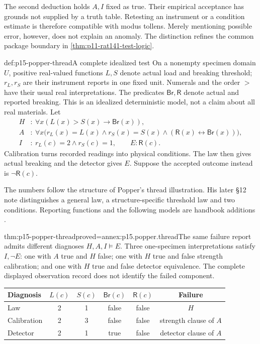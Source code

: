 The second deduction holds \(A,I\) fixed as true. Their empirical
acceptance has grounds not supplied by a truth table.
Retesting an instrument or a condition estimate is therefore
compatible with modus tollens. Merely mentioning possible error,
however, does not explain an anomaly.
The distinction refines the common package boundary in
\cref{thm:p11-rat141-test-logic}.

\begin{hbexample}{def:p15-popper-thread}{A complete idealized test}
On a nonempty specimen domain \(U\), positive real-valued functions
\(L,S\) denote actual load and breaking threshold; \(r_L,r_S\)
are their instrument reports in one fixed unit.
Numerals and the order \(>\) have their usual real interpretations.
The predicates \(\mathsf{Br},\mathsf R\) denote actual and reported
breaking. This is an idealized deterministic model, not a claim
about all real materials. Let
\[
\begin{aligned}
H&:\ \forall x(L(x)>S(x)\to\mathsf{Br}(x)),\\
A&:\ \forall x\bigl(r_L(x)=L(x)\land r_S(x)=S(x)
             \land(\mathsf R(x)\leftrightarrow\mathsf{Br}(x))\bigr),\\
I&:\ r_L(c)=2\land r_S(c)=1,\qquad E:\mathsf R(c).
\end{aligned}
\]
Calibration turns recorded readings into physical conditions.
The law then gives actual breaking and the detector gives \(E\).
Suppose the accepted outcome instead is \(\neg\mathsf R(c)\).

The numbers follow the structure of Popper's thread illustration.
His later \S12 note distinguishes a general law, a structure-specific
threshold law and two conditions. Reporting functions and the
following models are handbook additions
\parencite[\S12,note *1]{Popper2002LogicDiscoveryUI}.
\end{hbexample}

\begin{hbtheorem}{thm:p15-popper-thread}{proved=annex:p15.popper.thread}{The same failure report admits different diagnoses}
\(H,A,I\models E\). Three one-specimen interpretations satisfy
\(I,\neg E\): one with \(A\) true and \(H\) false; one with
\(H\) true and false strength calibration; and one with \(H\)
true and false detector equivalence.
The complete displayed observation record does not identify the
failed component.
\end{hbtheorem}

\begin{center}\small
\begin{tabular}{@{}lccccc@{}}
\toprule
Diagnosis&\(L(c)\)&\(S(c)\)&\(\mathsf{Br}(c)\)&\(\mathsf R(c)\)&Failure\\
\midrule
Law&2&1&false&false&\(H\)\\
Calibration&2&3&false&false&strength clause of \(A\)\\
Detector&2&1&true&false&detector clause of \(A\)\\
\bottomrule
\end{tabular}
\end{center}

